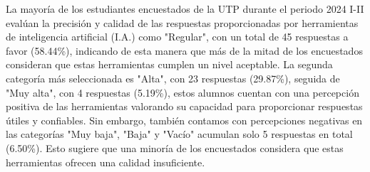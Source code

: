 La mayoría de los estudiantes encuestados de la UTP durante el periodo 2024 I-II evalúan la precisión y calidad de las respuestas proporcionadas por herramientas de inteligencia artificial (I.A.) como "Regular", con un total de 45 respuestas a favor (58.44\%), indicando de esta manera que más de la mitad de los encuestados consideran que estas herramientas cumplen un nivel aceptable. La segunda categoría más seleccionada es "Alta", con 23 respuestas (29.87\%), seguida de "Muy alta", con 4 respuestas (5.19\%), estos alumnos cuentan con una percepción positiva de las herramientas valorando su capacidad para proporcionar respuestas útiles y confiables. Sin embargo, también contamos con percepciones negativas en las categorías "Muy baja", "Baja" y "Vacío" acumulan solo 5 respuestas en total (6.50\%). Esto sugiere que una minoría de los encuestados considera que estas herramientas ofrecen una calidad insuficiente.
